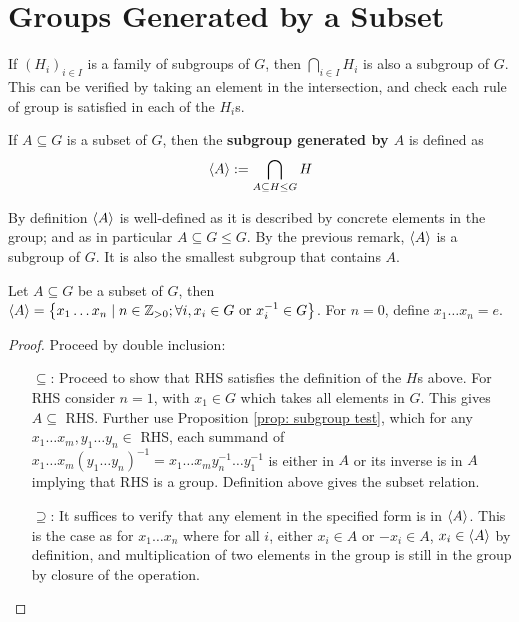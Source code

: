 \documentclass{article}
\begin{document}
\section{Groups Generated by a Subset}

\begin{remark}
    If $(H_i)_{i \in I}$ is a family of subgroups of $G$, then $\bigcap_{i \in I} H_i$ is also a subgroup of $G$. This can be verified by taking an element in the intersection, and check each rule of group is satisfied in each of the $H_i$s.
\end{remark}

\begin{definition}
    If $A \subseteq G$ is a subset of $G$, then the \textbf{subgroup generated by $A$} is defined as
    \[
        \left\langle A \right\rangle := \bigcap_{A \subseteq H \leq G} H
    \]
\end{definition}

\begin{remark}
    By definition $\left\langle A \right\rangle$ is well-defined as it is described by concrete elements in the group; and as in particular $A \subseteq G \leq G$. By the previous remark, $\left\langle A \right\rangle$ is a subgroup of $G$. It is also the smallest subgroup that contains $A$.
\end{remark}

\begin{proposition}\label{prop: explicit presentation of generated subgroup}
    Let $A \subseteq G$ be a subset of $G$, then $\left\langle A \right\rangle = \left\{ x_1\dots x_n \mid n \in \mathbb{Z}_{>0}; \forall i, x_i \in G \text{ or } x_i^{-1} \in G \right\}$. For $n = 0$, define $x_1 \dots x_n = e$. 
\end{proposition}

\begin{proof}
    Proceed by double inclusion:
    \begin{enumerate}
        \item[$\subseteq$:] Proceed to show that RHS satisfies the definition of the $H$s above. For RHS consider $n = 1$, with $x_1 \in G$ which takes all elements in $G$. This gives $A \subseteq$ RHS. Further use Proposition \ref{prop: subgroup test}, which for any $x_1\dots x_m, y_1\dots y_n \in$ RHS, each summand of $x_1 \dots x_m (y_1 \dots y_n)^{-1} = x_1 \dots x_m y_n^{-1} \dots y_1^{-1}$ is either in $A$ or its inverse is in $A$ implying that RHS is a group. Definition above gives the subset relation.
        \item[$\supseteq$:] It suffices to verify that any element in the specified form is in $\left\langle A \right\rangle$. This is the case as for $x_1\dots x_n$ where for all $i$, either $x_i \in A$ or $-x_i \in A$, $x_i \in \left\langle A \right\rangle$ by definition, and multiplication of two elements in the group is still in the group by closure of the operation.  
    \end{enumerate}
\end{proof}
\end{document}
